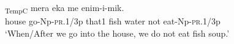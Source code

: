 \ea%
\label{ex:x1940}
\textsubscript{TempC}  mera  eka  me  enim-i-mik. \\
     house  go-Np-\textsc{pr}.1/3p  that1  fish  water  not  eat-Np-\textsc{pr}.1/3p \\
\glt `When/After we go into the house, we do not eat fish soup.'
\z

